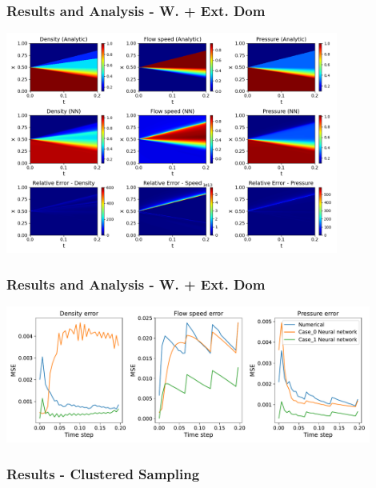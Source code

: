 \documentclass[aspectratio=169]{beamer}
\begin{document}
\begin{frame}\frametitle{Results and Analysis - W. + Ext. Dom}
	
	\begin{center}
		\includegraphics[width=0.82\textwidth]{Figures/Figure_6.png}
	\end{center}	
\end{frame}

\begin{frame}\frametitle{Results and Analysis - W. + Ext. Dom}
		
	\begin{center}
		\includegraphics[width=0.9\textwidth]{Figures/Figure_7.pdf}
	\end{center}	
\end{frame}

\begin{frame}\frametitle{Results - Clustered Sampling}
	
	\begin{center}
		 \\
	\end{center}
	
\end{frame}
\end{document}
